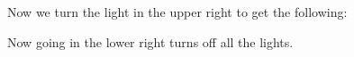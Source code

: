 \begin{enumerate}
Now we turn the light in the upper right to get the following:

   \begin{center}
\begin{chaossudoku}[rows=3,columns=3]
    \begin{puzzlebackground}




    \end{puzzlebackground}
  \end{chaossudoku}
\end{center}

Now going in the lower right turns off all the lights.

\end{enumerate}


%


